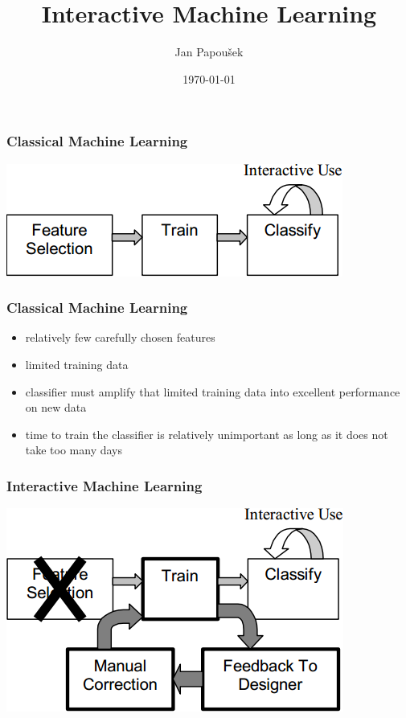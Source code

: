 \documentclass[xcolor=svgnames]{beamer}
\title{Interactive Machine Learning}
\author{Jan Papoušek}
\institute{Masaryk University Brno}
\date{\today}
\begin{document}
\frame[plain]{\titlepage}
\begin{frame}
	\frametitle{Classical Machine Learning}
	\begin{center}
		\includegraphics[width=.75\textwidth]{img/cml.png}
	\end{center}
\end{frame}
\begin{frame}
	\frametitle{Classical Machine Learning}
	\begin{itemize}
		\item relatively few carefully chosen features
		\item limited training data
		\item classifier must amplify that limited training data
					into excellent performance on new data
		\item time to train the classifier is relatively unimportant as
					long as it does not take too many days
	\end{itemize}
\end{frame}
\begin{frame}
	\frametitle{Interactive Machine Learning}
	\begin{center}
		\includegraphics[width=.75\textwidth]{img/iml.png}
	\end{center}
\end{frame}
\end{document}
